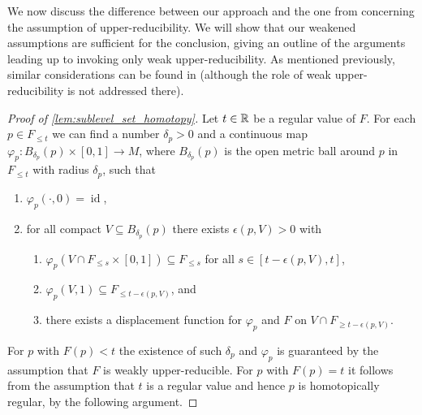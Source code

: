 We now discuss the difference between our approach and the one from \cite[Theorem 8.1]{Morse.1938} concerning the assumption of upper-reducibility.
We will show that our weakened assumptions are sufficient for the conclusion, giving an outline of the arguments leading up to \cite[Theorem 8.1]{Morse.1938} invoking only weak upper-reducibility.
As mentioned previously, similar considerations can be found in \cite[Remark II.6.3]{Struwe.1988} (although the role of weak upper-reducibility is not addressed there). 
\begin{proof}[Proof of \cref{lem:sublevel_set_homotopy}]
	Let $t \in \mathbb{R}$ be a regular value of $F$.
	For each $p \in F_{\leq t}$ we can find a number $\delta_{p} > 0$ and a continuous map $\varphi_{p} \colon B_{\delta_{p}}(p) \times [0,1] \to M$, where $B_{\delta_{p}}(p)$ is the open metric ball around $p$ in $F_{\leq t}$ with radius $\delta_{p}$, such that
	\begin{enumerate}[label={(\arabic*)}]
		\item \label{item:id} $\varphi_{p}(\cdot,0) = \operatorname{id}$,
		\item \label{item:epsilon} for all compact $V \subseteq B_{\delta_{p}}(p)$ there exists $\epsilon(p,V) > 0$ with
		\begin{enumerate}[label={(\alph*)}]
			\item \label{item:s_below_s} $\varphi_{p}(V \cap F_{\leq s}\times [0,1]) \subseteq F_{\leq s}$ for all $s \in [t - \epsilon(p,V), t]$,
			\item \label{item:contracting} $\varphi_{p}(V,1) \subseteq F_{\leq t - \epsilon(p,V)}$, and
			\item \label{item:displacement} there exists a displacement function for $\varphi_{p}$ and $F$ on $V \cap F_{\geq t - \epsilon(p,V)}$.
		\end{enumerate}
	\end{enumerate}
	For $p$ with $F(p) < t$ the existence of such $\delta_{p}$ and $\varphi_{p}$ is guaranteed by the assumption that $F$ is weakly upper-reducible.
	For $p$ with $F(p) = t$ it follows from the assumption that $t$ is a regular value and hence $p$ is homotopically regular, by the following argument.


\end{proof}
